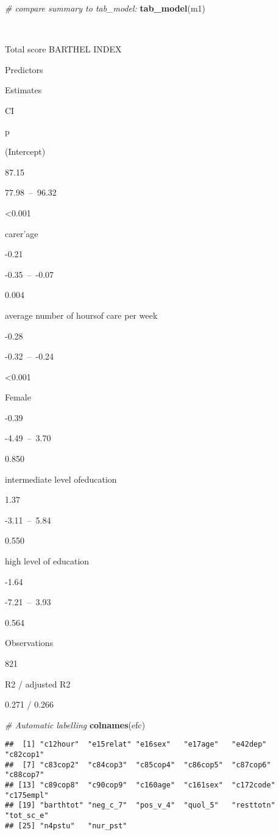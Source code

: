 \documentclass[]{article}
\newenvironment{Shaded}{\begin{snugshade}}{\end{snugshade}}
\newcommand{\KeywordTok}[1]{\textcolor[rgb]{0.13,0.29,0.53}{\textbf{#1}}}
\newcommand{\CommentTok}[1]{\textcolor[rgb]{0.56,0.35,0.01}{\textit{#1}}}
\newcommand{\NormalTok}[1]{#1}
\begin{document}
\begin{Shaded}
\begin{Highlighting}[]
\CommentTok{# compare summary to tab_model:}
\KeywordTok{tab_model}\NormalTok{(m1)}
\end{Highlighting}
\end{Shaded}

~

Total score BARTHEL INDEX

Predictors

Estimates

CI

p

(Intercept)

87.15

77.98~--~96.32

\textless{}0.001

carer'age

-0.21

-0.35~--~-0.07

0.004

average number of hoursof care per week

-0.28

-0.32~--~-0.24

\textless{}0.001

Female

-0.39

-4.49~--~3.70

0.850

intermediate level ofeducation

1.37

-3.11~--~5.84

0.550

high level of education

-1.64

-7.21~--~3.93

0.564

Observations

821

R2 / adjusted R2

0.271 / 0.266

\begin{Shaded}
\begin{Highlighting}[]
\CommentTok{# Automatic labelling}
\KeywordTok{colnames}\NormalTok{(efc)}
\end{Highlighting}
\end{Shaded}

\begin{verbatim}
##  [1] "c12hour"  "e15relat" "e16sex"   "e17age"   "e42dep"   "c82cop1" 
##  [7] "c83cop2"  "c84cop3"  "c85cop4"  "c86cop5"  "c87cop6"  "c88cop7" 
## [13] "c89cop8"  "c90cop9"  "c160age"  "c161sex"  "c172code" "c175empl"
## [19] "barthtot" "neg_c_7"  "pos_v_4"  "quol_5"   "resttotn" "tot_sc_e"
## [25] "n4pstu"   "nur_pst"
\end{verbatim}
\end{document}
